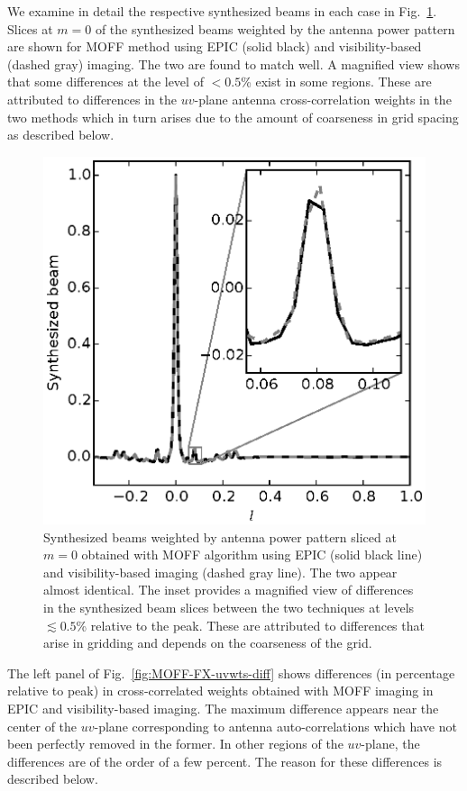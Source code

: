 \documentclass[a4paper,fleqn,usenatbib]{mnras}
\begin{document}
We examine in detail the respective synthesized beams in each case in Fig.~\ref{fig:MOFF-FX-psf-diff}. Slices at $m=0$ of the synthesized beams weighted by the antenna power pattern are shown for MOFF method using EPIC (solid black) and visibility-based (dashed gray) imaging. The two are found to match well. A magnified view shows that some differences at the level of $<0.5$\% exist in some regions. These are attributed to differences in the $uv$-plane antenna cross-correlation weights in the two methods which in turn arises due to the amount of coarseness in grid spacing as described below.

\begin{figure}
  \includegraphics[width=\columnwidth]{figure6}
  \caption{Synthesized beams weighted by antenna power pattern sliced at $m=0$ obtained with MOFF algorithm using EPIC (solid black line) and visibility-based imaging (dashed gray line). The two appear almost identical. The inset provides a magnified view of differences in the synthesized beam slices between the two techniques at levels $\lesssim 0.5$\% relative to the peak. These are attributed to differences that arise in gridding and depends on the coarseness of the grid.}
  \label{fig:MOFF-FX-psf-diff}
\end{figure}

The left panel of Fig.~\ref{fig:MOFF-FX-uvwts-diff} shows differences (in percentage relative to peak) in cross-correlated weights obtained with MOFF imaging in EPIC and visibility-based imaging. The maximum difference appears near the center of the $uv$-plane corresponding to antenna auto-correlations which have not been perfectly removed in the former. In other regions of the $uv$-plane, the differences are of the order of a few percent. The reason for these differences is described below.
\end{document}
